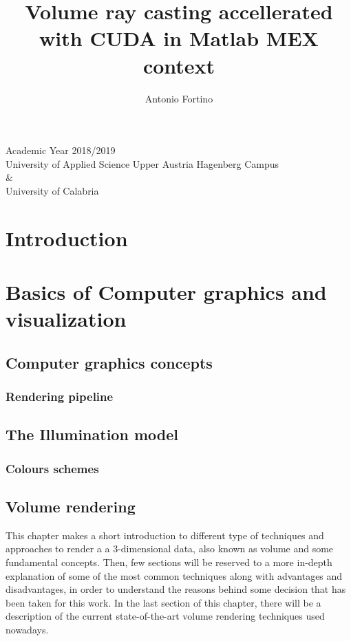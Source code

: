 \documentclass[10pt,a4paper]{article}
\author{Antonio Fortino}
\title{Volume ray casting accellerated with CUDA in Matlab MEX context}
\begin{document}
\maketitle
\begin{center}
Academic Year 2018/2019\\
University of Applied Science Upper Austria Hagenberg Campus\\
\&\\
University of Calabria
\end{center}
\pagebreak
\tableofcontents
\pagebreak
\section{Introduction} %

\section{Basics of Computer graphics and visualization}
\subsection{Computer graphics concepts} %
\subsubsection{Rendering pipeline} %
\subsection{The Illumination model} %
\subsubsection{Colours schemes} %
\pagebreak
\subsection{Volume rendering} 
This chapter makes a short introduction to different type of techniques and approaches to render a a 3-dimensional data, also known as volume and some fundamental concepts. Then, few sections will be reserved to a more in-depth explanation of some of the most common techniques along with advantages and disadvantages, in order to understand the reasons behind some decision that has been taken for this work.
In the last section of this chapter, there will be a description of the current state-of-the-art volume rendering techniques used nowadays.\\
\end{document}
